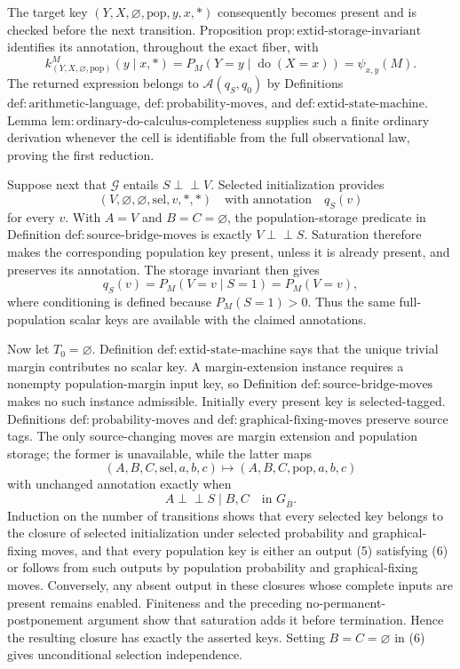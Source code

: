 The target key \((Y,X,\varnothing,\mathrm{pop},y,x,\ast)\) consequently becomes present and is checked before the next transition. Proposition \(\mathrm{prop{:}extid\text{-}storage\text{-}invariant}\) identifies its annotation, throughout the exact fiber, with
\[
 k^M_{(Y,X,\varnothing,\mathrm{pop})}(y\mid x,\ast)
 =P_M(Y=y\mid\operatorname{do}(X=x))
 =\psi_{x,y}(M).
 \tag{3}
\]
The returned expression belongs to \(\mathcal A(q_S,q_0)\) by Definitions \(\mathrm{def{:}arithmetic\text{-}language}\), \(\mathrm{def{:}probability\text{-}moves}\), and \(\mathrm{def{:}extid\text{-}state\text{-}machine}\). Lemma \(\mathrm{lem{:}ordinary\text{-}do\text{-}calculus\text{-}completeness}\) supplies such a finite ordinary derivation whenever the cell is identifiable from the full observational law, proving the first reduction.

Suppose next that \(\mathcal G\) entails \(S\perp\!\!\!\perp V\). Selected initialization provides
\[
 (V,\varnothing,\varnothing,\mathrm{sel},v,\ast,\ast)
 \quad\text{with annotation}\quad q_S(v)
\]
for every \(v\). With \(A=V\) and \(B=C=\varnothing\), the population-storage predicate in Definition \(\mathrm{def{:}source\text{-}bridge\text{-}moves}\) is exactly \(V\perp\!\!\!\perp S\). Saturation therefore makes the corresponding population key present, unless it is already present, and preserves its annotation. The storage invariant then gives
\[
 q_S(v)=P_M(V=v\mid S=1)=P_M(V=v),
 \tag{4}
\]
where conditioning is defined because \(P_M(S=1)>0\). Thus the same full-population scalar keys are available with the claimed annotations.

Now let \(T_0=\varnothing\). Definition \(\mathrm{def{:}extid\text{-}state\text{-}machine}\) says that the unique trivial margin contributes no scalar key. A margin-extension instance requires a nonempty population-margin input key, so Definition \(\mathrm{def{:}source\text{-}bridge\text{-}moves}\) makes no such instance admissible. Initially every present key is selected-tagged. Definitions \(\mathrm{def{:}probability\text{-}moves}\) and \(\mathrm{def{:}graphical\text{-}fixing\text{-}moves}\) preserve source tags. The only source-changing moves are margin extension and population storage; the former is unavailable, while the latter maps
\[
 (A,B,C,\mathrm{sel},a,b,c)
 \longmapsto
 (A,B,C,\mathrm{pop},a,b,c)
 \tag{5}
\]
with unchanged annotation exactly when
\[
 A\perp\!\!\!\perp S\mid B,C
 \quad\text{in }G_{\overline B}.
 \tag{6}
\]
Induction on the number of transitions shows that every selected key belongs to the closure of selected initialization under selected probability and graphical-fixing moves, and that every population key is either an output (5) satisfying (6) or follows from such outputs by population probability and graphical-fixing moves. Conversely, any absent output in these closures whose complete inputs are present remains enabled. Finiteness and the preceding no-permanent-postponement argument show that saturation adds it before termination. Hence the resulting closure has exactly the asserted keys. Setting \(B=C=\varnothing\) in (6) gives unconditional selection independence.

